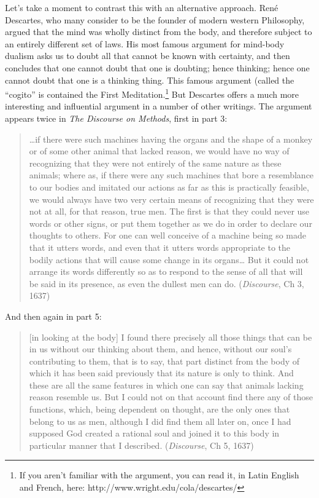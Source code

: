 Let’s take a moment to contrast this with an alternative approach. René Descartes, who many consider to be the founder of modern western Philosophy, argued that the mind was wholly distinct from the body, and therefore subject to an entirely different set of laws. His most famous argument for mind-body dualism asks us to doubt all that cannot be known with certainty, and then concludes that one cannot doubt that one is doubting; hence thinking; hence one cannot doubt that one is a thinking thing. This famous argument (called the “cogito” is contained the First Meditation.\footnote{If you aren't familiar with the argument, you can read it, in Latin English and French, here: http:\slash \slash www.wright.edu\slash cola\slash descartes\slash } But Descartes offers a much more interesting and influential argument in a number of other writings. The argument appears twice in \emph{The Discourse on Methods}, first in part 3:

\begin{quote}

{\ldots}if there were such machines having the organs and the shape of a monkey or of some other animal that lacked reason, we would have no way of recognizing that they were not entirely of the same nature as these animals; where as, if there were any such machines that bore a resemblance to our bodies and imitated our actions as far as this is practically feasible, we would always have two very certain means of recognizing that they were not at all, for that reason, true men. The first is that they could never use words or other signs, or put them together as we do in order to declare our thoughts to others. For one can well conceive of a machine being so made that it utters words, and even that it utters words appropriate to the bodily actions that will cause some change in its organs{\ldots} But it could not arrange its words differently so as to respond to the sense of all that will be said in its presence, as even the dullest men can do. (\emph{Discourse}, Ch 3, 1637)
\end{quote}

And then again in part 5:

\begin{quote}

[in looking at the body] I found there precisely all those things that can be in us without our thinking about them, and hence, without our soul's contributing to them, that is to say, that part distinct from the body of which it has been said previously that its nature is only to think. And these are all the same features in which one can say that animals lacking reason resemble us. But I could not on that account find there any of those functions, which, being dependent on thought, are the only ones that belong to us as men, although I did find them all later on, once I had supposed God created a rational soul and joined it to this body in particular manner that I described. (\emph{Discourse}, Ch 5, 1637)
\end{quote}

